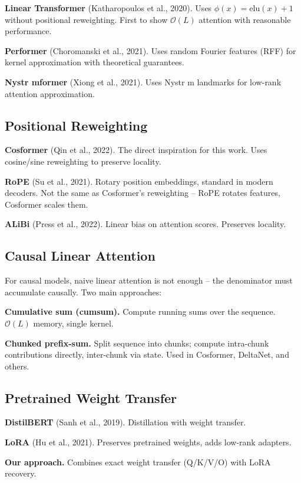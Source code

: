 \textbf{Linear Transformer} (Katharopoulos et al., 2020). Uses $\phi(x) = \text{elu}(x) + 1$ 
without positional reweighting. First to show $\mathcal{O}(L)$ attention 
with reasonable performance.

\textbf{Performer} (Choromanski et al., 2021). Uses random Fourier features 
(RFF) for kernel approximation with theoretical guarantees.

\textbf{Nystr mformer} (Xiong et al., 2021). Uses Nystr m landmarks for low-rank 
attention approximation.

\subsection{Positional Reweighting}

\textbf{Cosformer} (Qin et al., 2022). The direct inspiration for this work. 
Uses cosine/sine reweighting to preserve locality.

\textbf{RoPE} (Su et al., 2021). Rotary position embeddings, standard in modern 
decoders. Not the same as Cosformer's reweighting -- RoPE rotates features, 
Cosformer scales them.

\textbf{ALiBi} (Press et al., 2022). Linear bias on attention scores. Preserves 
locality.

\subsection{Causal Linear Attention}

For causal models, naive linear attention is not enough -- the denominator 
must accumulate causally. Two main approaches:

\textbf{Cumulative sum (cumsum).} Compute running sums over the sequence. 
$\mathcal{O}(L)$ memory, single kernel.

\textbf{Chunked prefix-sum.} Split sequence into chunks; compute intra-chunk 
contributions directly, inter-chunk via state. Used in Cosformer, DeltaNet, 
and others.

\subsection{Pretrained Weight Transfer}

\textbf{DistilBERT} (Sanh et al., 2019). Distillation with weight transfer.

\textbf{LoRA} (Hu et al., 2021). Preserves pretrained weights, adds low-rank 
adapters.

\textbf{Our approach.} Combines exact weight transfer (Q/K/V/O) with LoRA recovery.

